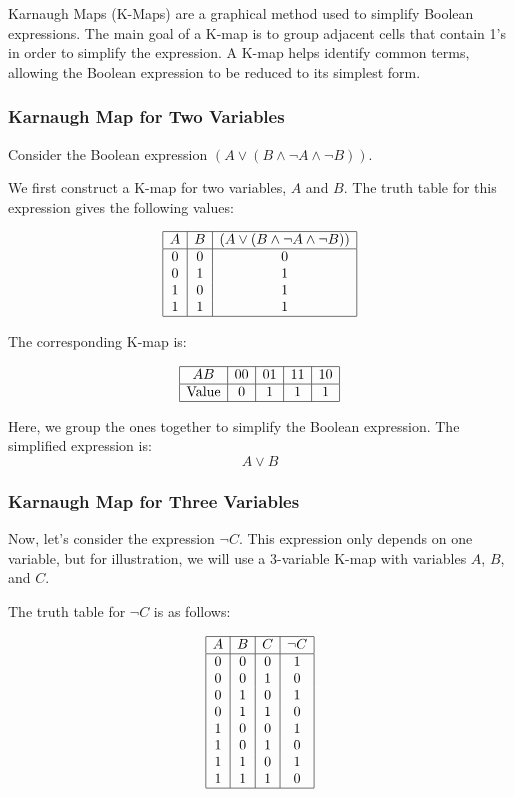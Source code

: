 Karnaugh Maps (K-Maps) are a graphical method used to simplify Boolean expressions. The main goal of a K-map is to group adjacent cells that contain 1's in order to simplify the expression. A K-map helps identify common terms, allowing the Boolean expression to be reduced to its simplest form.

\subsubsection{Karnaugh Map for Two Variables}

Consider the Boolean expression \( (A \lor (B \land \neg A \land \neg B)) \). 

We first construct a K-map for two variables, \( A \) and \( B \). The truth table for this expression gives the following values:

\[
\begin{array}{|c|c|c|}
\hline
A & B & (A \lor (B \land \neg A \land \neg B)) \\
\hline
0 & 0 & 0 \\
0 & 1 & 1 \\
1 & 0 & 1 \\
1 & 1 & 1 \\
\hline
\end{array}
\]

The corresponding K-map is:

\[
\begin{array}{|c|c|c|c|c|}
\hline
AB & 00 & 01 & 11 & 10 \\
\hline
\text{Value} & 0  & 1  & 1  & 1 \\
\hline
\end{array}
\]

Here, we group the ones together to simplify the Boolean expression. The simplified expression is:
\[
A \lor B
\]

\subsubsection{Karnaugh Map for Three Variables}

Now, let's consider the expression \( \neg C \). This expression only depends on one variable, but for illustration, we will use a 3-variable K-map with variables \( A \), \( B \), and \( C \).

The truth table for \( \neg C \) is as follows:

\[
\begin{array}{|c|c|c|c|}
\hline
A & B & C & \neg C \\
\hline
0 & 0 & 0 & 1 \\
0 & 0 & 1 & 0 \\
0 & 1 & 0 & 1 \\
0 & 1 & 1 & 0 \\
1 & 0 & 0 & 1 \\
1 & 0 & 1 & 0 \\
1 & 1 & 0 & 1 \\
1 & 1 & 1 & 0 \\
\hline
\end{array}
\]

